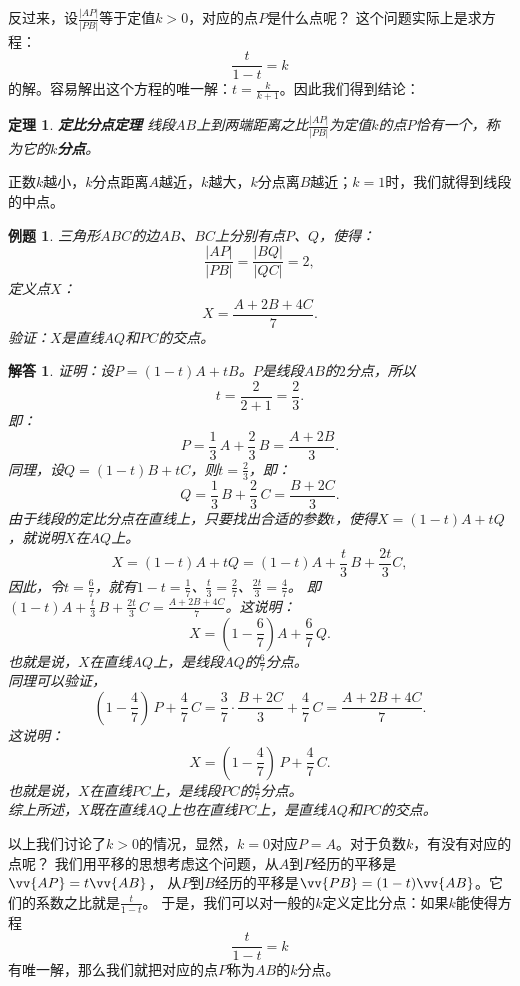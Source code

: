 \documentclass[12pt,UTF8]{ctexbook}
\newtheorem{tm}{定理}[section]
\newtheorem{et}{例题}[section]
\newtheorem*{so}{解答}
\begin{document}
反过来，设$ \frac{|AP|}{|PB|}$等于定值$k > 0$，对应的点$P$是什么点呢？
这个问题实际上是求方程：
$$ \frac{t}{1 - t} = k$$
的解。容易解出这个方程的唯一解：$t = \frac{k}{k+1}$。因此我们得到结论：
\begin{tm}{\textbf{定比分点定理} }\label{tm:0-0-10}
    线段$AB$上到两端距离之比$\frac{|AP|}{|PB|}$为定值$k$的点$P$恰有一个，称为它的$k$\textbf{分点}。
\end{tm}
正数$k$越小，$k$分点距离$A$越近，$k$越大，$k$分点离$B$越近；$k=1$时，我们就得到线段的中点。

\begin{et}\label{et:0-0-10}
    三角形$ABC$的边$AB$、$BC$上分别有点$P$、$Q$，使得：
    $$ \frac{|AP|}{|PB|} = \frac{|BQ|}{|QC|} = 2,$$
    定义点$X$：
    $$ X = \frac{A + 2B + 4C}{7}.$$
    验证：$X$是直线$AQ$和$PC$的交点。
\end{et}
\begin{so}
    证明：设$P = (1 - t)A + tB$。$P$是线段$AB$的$2$分点，所以
    $$ t = \frac{2}{2+1} = \frac23. $$
    即：
    $$ P = \frac13\, A + \frac23 \, B = \frac{A + 2B}{3}.$$
    同理，设$Q = (1 - t)B + tC$，则$t = \frac23$，即：
    $$ Q = \frac{1}{3} \, B + \frac{2}{3}\, C = \frac{B + 2C}{3}. $$
    由于线段的定比分点在直线上，只要找出合适的参数$t$，使得$X = (1 - t)A + tQ$，就说明$X$在$AQ$上。
    $$ X = (1 - t)A + tQ = (1 - t)A + \frac{t}{3}\,B + \frac{2t}{3}C,$$
    因此，令$t = \frac{6}{7}$，就有$1 - t = \frac{1}{7}$、$\frac{t}{3} = \frac27$、$\frac{2t}{3} = \frac{4}{7}$。
    即$(1 - t)A + \frac{t}{3} \, B + \frac{2t}{3} \, C = \frac{A + 2B + 4C}{7}$。这说明：
    $$ X = (1 - \frac{6}{7})A + \frac{6}{7} \, Q. $$
    也就是说，$X$在直线$AQ$上，是线段$AQ$的$\frac{6}{7}$分点。\\
    同理可以验证，
    $$ (1 - \frac{4}{7})\, P + \frac{4}{7}\, C = \frac{3}{7} \cdot \frac{B + 2C}{3} + \frac{4}{7} \, C = \frac{A + 2B + 4C}{7}. $$
    这说明：
    $$ X = (1 - \frac{4}{7}) \, P + \frac{4}{7} \, C. $$
    也就是说，$X$在直线$PC$上，是线段$PC$的$\frac{4}{7}$分点。\\
    综上所述，$X$既在直线$AQ$上也在直线$PC$上，是直线$AQ$和$PC$的交点。
\end{so}

以上我们讨论了$k>0$的情况，显然，$k=0$对应$P = A$。对于负数$k$，有没有对应的点呢？
我们用平移的思想考虑这个问题，从$A$到$P$经历的平移是$\vv{AP} = t\vv{AB}$，
从$P$到$B$经历的平移是$\vv{PB} = (1 - t)\vv{AB}$。它们的系数之比就是$ \frac{t}{1 - t}$。
于是，我们可以对一般的$k$定义定比分点：如果$k$能使得方程
$$ \frac{t}{1 - t} = k$$
有唯一解，那么我们就把对应的点$P$称为$AB$的$k$分点。
\end{document}
